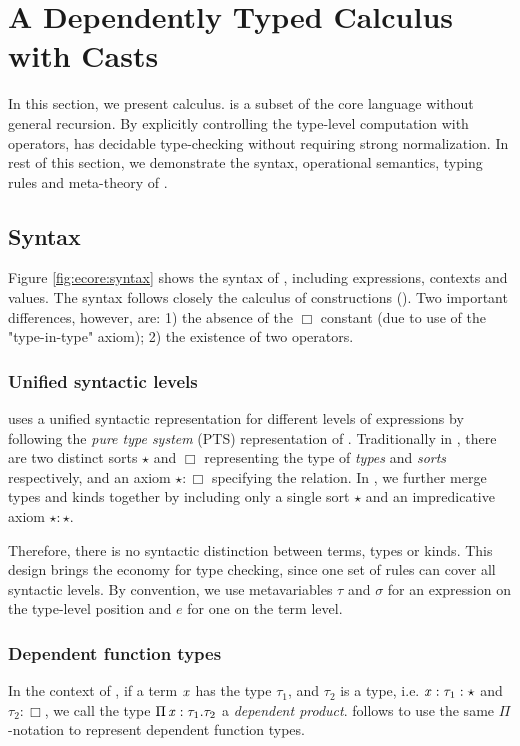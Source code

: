 
\section{A Dependently Typed Calculus with Casts}\label{sec:ecore}

In this section, we present \ecore calculus. \ecore is a subset of the core
language \name without general recursion. By explicitly controlling the type-level
computation with \cast operators, \ecore has decidable type-checking
without requiring strong normalization. In rest of this
section, we demonstrate the syntax, operational semantics, typing
rules and meta-theory of \ecore.

\subsection{Syntax}\label{sec:ecore:syn}
Figure \ref{fig:ecore:syntax} shows the syntax of \ecore, including
expressions, contexts and values. The syntax follows closely the
calculus of constructions (\cc). Two important differences, however, are: 1)
the absence of the $\Box$ constant (due to use of the "type-in-type"
axiom); 2) the existence of two \cast operators.

\subsubsection{Unified syntactic levels}
\ecore uses a unified syntactic representation for different levels of
expressions by following the \emph{pure type system} (PTS)
representation of \cc. Traditionally in \cc, there are two distinct
sorts $\star$ and $\Box$ representing the type of
\emph{types} and \emph{sorts} respectively, and an axiom
$\star:\Box$ specifying the relation. In \ecore, we further
merge types and kinds together by including only a single sort
$\star$ and an impredicative axiom $\star:\star$. 

Therefore, there is no syntactic distinction between terms, types or
kinds. This design brings the economy for type checking, since one set
of rules can cover all syntactic levels. By convention, we use
metavariables $\tau$ and $\sigma$ for an expression on the type-level
position and $e$ for one on the term level.

\subsubsection{Dependent function types}
In the context of \cc, if a term $\mathit{x}$ has the type $\tau_{{\mathrm{1}}}$, and $\tau_{{\mathrm{2}}}$ is a type, i.e. $\mathit{x}:\tau_{{\mathrm{1}}}:\star$ and $\tau_{{\mathrm{2}}}:\Box$, we call the type $\Pi \, \mathit{x}  :  \tau_{{\mathrm{1}}}  .  \tau_{{\mathrm{2}}}$ a \emph{dependent product}. \ecore follows \cc to use the same $ \Pi $-notation to represent dependent function types.

